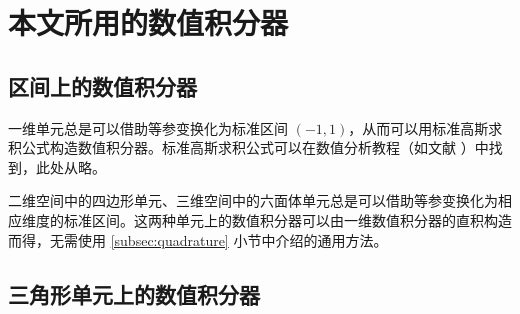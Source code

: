 
\chapter{本文所用的数值积分器\label{chap:gaussian_pairs}}

\section{区间上的数值积分器}

一维单元总是可以借助等参变换化为标准区间 $(-1,1)$，从而可以用标准高斯求积公式构造数值积分器。标准高斯求积公式可以在数值分析教程（如文献 \cite{Quarteroni_2007}）中找到，此处从略。

二维空间中的四边形单元、三维空间中的六面体单元总是可以借助等参变换化为相应维度的标准区间。这两种单元上的数值积分器可以由一维数值积分器的直积构造而得，无需使用
\ref{subsec:quadrature} 小节中介绍的通用方法。

\section{三角形单元上的数值积分器}

